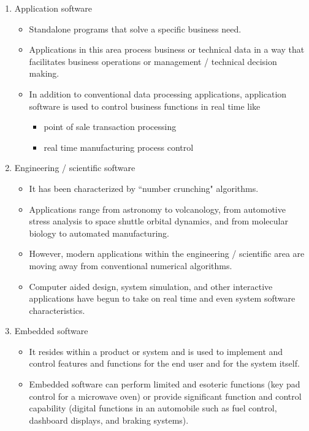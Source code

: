 \documentclass{article}
\begin{document}
\begin{enumerate}[label=\arabic*)]
		\item Application software
			\begin{itemize}
				\item Standalone programs that solve a specific business need.
				\item Applications in this area process business or technical data in a way that facilitates
					business operations or management / technical decision making.
				\item In addition to conventional data processing applications, application software is used to
					control business functions in real time like
				\begin{itemize}
					\item point of sale transaction processing
					\item real time manufacturing process control
				\end{itemize}
			\end{itemize}
		\item Engineering / scientific software
			\begin{itemize}
				\item It has been characterized by ``number crunching" algorithms.
				\item Applications range from astronomy to volcanology, from automotive stress analysis to space
					shuttle orbital dynamics, and from molecular biology to automated manufacturing.
				\item However, modern applications within the engineering / scientific area are moving away from
					conventional numerical algorithms.
				\item Computer aided design, system simulation, and other interactive applications have begun to
					take on real time and even system software characteristics.
			\end{itemize}
		\item Embedded software
			\begin{itemize}
				\item It resides within a product or system and is used to implement and control features and
					functions for the end user and for the system itself.
				\item Embedded software can perform limited and esoteric functions (key pad control for a
					microwave oven) or provide significant function and control capability (digital functions in
					an automobile such as fuel control, dashboard displays, and braking systems).
			\end{itemize}

\end{enumerate}
\end{document}
